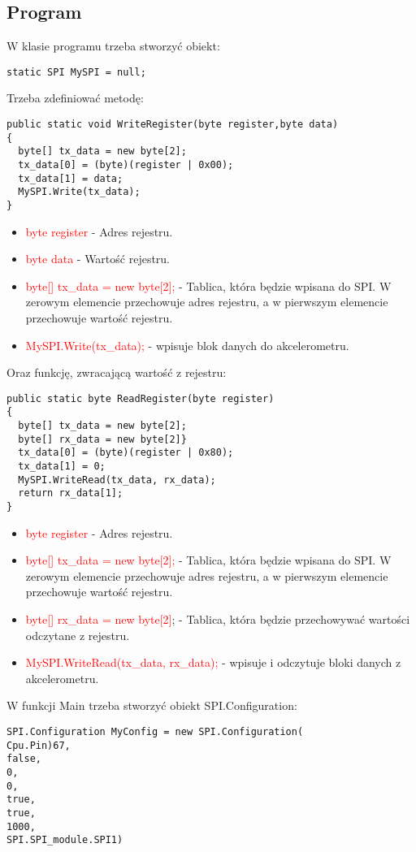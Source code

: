 \documentclass{article}
\begin{document}
\subsection{Program}
W klasie programu trzeba stworzyć obiekt:
\begin{lstlisting}[frame=single]
static SPI MySPI = null;
\end{lstlisting}
Trzeba zdefiniować metodę:
\begin{lstlisting}[frame=single]
public static void WriteRegister(byte register,byte data)
{
  byte[] tx_data = new byte[2];
  tx_data[0] = (byte)(register | 0x00);
  tx_data[1] = data;   
  MySPI.Write(tx_data);
}
\end{lstlisting}
\begin{itemize}
\item \textcolor{red}{byte register} - Adres rejestru.
\item \textcolor{red}{byte data} - Wartość rejestru.
\item \textcolor{red}{byte[] tx\_data = new byte[2];} - Tablica, która będzie wpisana do SPI. W zerowym elemencie przechowuje adres rejestru, a w pierwszym elemencie przechowuje wartość rejestru.
\item \textcolor{red}{MySPI.Write(tx\_data);} - wpisuje blok danych do akcelerometru.
\end{itemize}
Oraz funkcję, zwracającą wartość z rejestru:
\begin{lstlisting}[frame=single]
public static byte ReadRegister(byte register)
{
  byte[] tx_data = new byte[2];
  byte[] rx_data = new byte[2]}
  tx_data[0] = (byte)(register | 0x80);
  tx_data[1] = 0;
  MySPI.WriteRead(tx_data, rx_data);
  return rx_data[1];
}
\end{lstlisting}
\begin{itemize}
\item \textcolor{red}{byte register} - Adres rejestru.
\item \textcolor{red}{byte[] tx\_data = new byte[2];} - Tablica, która będzie wpisana do SPI. W zerowym elemencie przechowuje adres rejestru, a w pierwszym elemencie przechowuje wartość rejestru.
\item \textcolor{red}{byte[] rx\_data = new byte[2]}; - Tablica, która będzie przechowywać wartości odczytane z rejestru.
\item \textcolor{red}{MySPI.WriteRead(tx\_data, rx\_data);} - wpisuje i odczytuje bloki danych z akcelerometru.
\end{itemize}
W funkcji Main trzeba stworzyć obiekt SPI.Configuration:
\begin{lstlisting}[frame=single]
SPI.Configuration MyConfig = new SPI.Configuration(
Cpu.Pin)67,
false,
0,
0,
true,
true,
1000,
SPI.SPI_module.SPI1)
\end{lstlisting}
\end{document}

